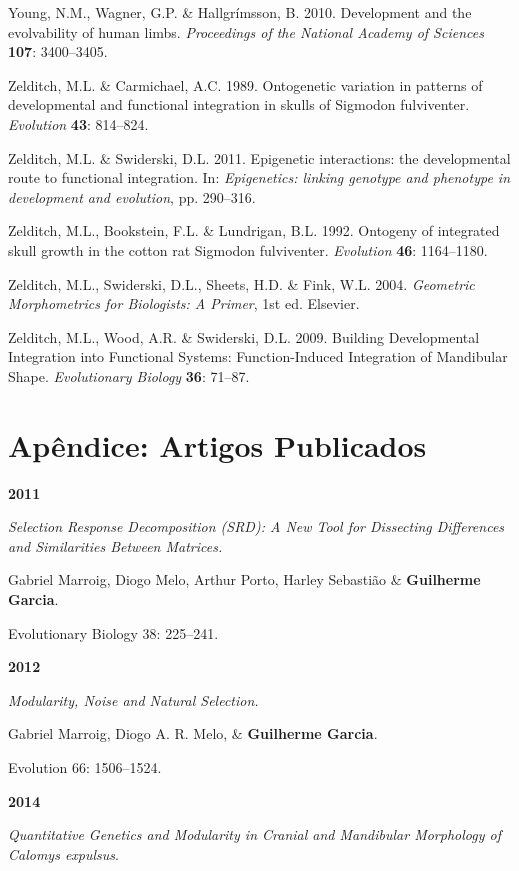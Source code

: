 \documentclass[12pt,twoside]{report}
\begin{document}
Young, N.M., Wagner, G.P. \& Hallgrímsson, B. 2010. Development and the
evolvability of human limbs. \emph{Proceedings of the National Academy
of Sciences} \textbf{107}: 3400--3405.

Zelditch, M.L. \& Carmichael, A.C. 1989. Ontogenetic variation in
patterns of developmental and functional integration in skulls of
Sigmodon fulviventer. \emph{Evolution} \textbf{43}: 814--824.

Zelditch, M.L. \& Swiderski, D.L. 2011. Epigenetic interactions: the
developmental route to functional integration. In: \emph{Epigenetics:
linking genotype and phenotype in development and evolution}, pp.
290--316.

Zelditch, M.L., Bookstein, F.L. \& Lundrigan, B.L. 1992. Ontogeny of
integrated skull growth in the cotton rat Sigmodon fulviventer.
\emph{Evolution} \textbf{46}: 1164--1180.

Zelditch, M.L., Swiderski, D.L., Sheets, H.D. \& Fink, W.L. 2004.
\emph{Geometric Morphometrics for Biologists: A Primer}, 1st ed.
Elsevier.

Zelditch, M.L., Wood, A.R. \& Swiderski, D.L. 2009. Building
Developmental Integration into Functional Systems: Function-Induced
Integration of Mandibular Shape. \emph{Evolutionary Biology}
\textbf{36}: 71--87.

\chapter*{Apêndice: Artigos Publicados}

\textbf{2011}

\textit{Selection Response Decomposition (SRD): A New Tool for Dissecting Differences and Similarities Between Matrices.}

Gabriel Marroig, Diogo Melo, Arthur Porto, Harley Sebastião \& \textbf{Guilherme Garcia}.

Evolutionary Biology 38: 225–241.

\vspace {0.3 cm}

\textbf {2012}

\textit {Modularity, Noise and Natural Selection.}

Gabriel Marroig, Diogo A. R. Melo, \& \textbf {Guilherme Garcia}.  

Evolution 66: 1506–1524.

\vspace {0.3 cm}

\textbf{2014}

\textit{Quantitative Genetics and Modularity in Cranial and Mandibular Morphology of \emph{Calomys expulsus}}.
\end{document}

